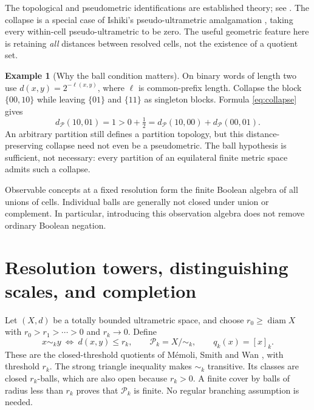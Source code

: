 \documentclass[11pt]{article}
\theoremstyle{definition}
\newtheorem{example}[theorem]{Example}
\theoremstyle{remark}
\newcommand{\diam}{\operatorname{diam}}
\newcommand{\PP}{\mathcal P}
\begin{document}
The topological and pseudometric identifications are established theory; see \cite[Theorem 5.3]{Pirttimaki2019}. The collapse is a special case of Ishiki's pseudo-ultrametric amalgamation \cite[Proposition 2.31]{Ishiki2023}, taking every within-cell pseudo-ultrametric to be zero. The useful geometric feature here is retaining \emph{all} distances between resolved cells, not the existence of a quotient set.

\begin{example}[Why the ball condition matters]\label{ex:arbitrary}
On binary words of length two use $d(x,y)=2^{-\ell(x,y)}$, where $\ell$ is common-prefix length. Collapse the block $\{00,10\}$ while leaving $\{01\}$ and $\{11\}$ as singleton blocks. Formula \eqref{eq:collapse} gives
\[
 d_{\PP}(10,01)=1>0+\tfrac12
 =d_{\PP}(10,00)+d_{\PP}(00,01).
\]
An arbitrary partition still defines a partition topology, but this distance-preserving collapse need not even be a pseudometric. The ball hypothesis is sufficient, not necessary: every partition of an equilateral finite metric space admits such a collapse.
\end{example}

Observable concepts at a fixed resolution form the finite Boolean algebra of all unions of cells. Individual balls are generally not closed under union or complement. In particular, introducing this observation algebra does not remove ordinary Boolean negation.

\section{Resolution towers, distinguishing scales, and completion}\label{sec:tower}
Let $(X,d)$ be a totally bounded ultrametric space, and choose $r_0\geq\diam X$ with
$r_0>r_1>\cdots>0$ and $r_k\to0$. Define
\[
 x\sim_k y\ \Longleftrightarrow\ d(x,y)\leq r_k,
 \qquad \PP_k=X/{\sim_k},\qquad q_k(x)=[x]_k.
\]
These are the closed-threshold quotients of M\'emoli, Smith and Wan \cite[Section 2.1, Equation (5) and Definition 10]{MemoliSmithWan2023}, with threshold $r_k$. The strong triangle inequality makes $\sim_k$ transitive. Its classes are closed $r_k$-balls, which are also open because $r_k>0$. A finite cover by balls of radius less than $r_k$ proves that $\PP_k$ is finite. No regular branching assumption is needed.
\end{document}
